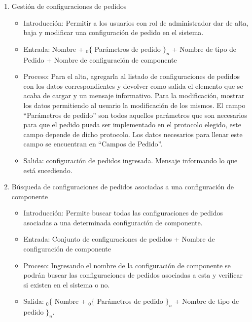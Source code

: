 \begin{enumerate}
			\item Gestión de configuraciones de pedidos
				\begin{itemize}
					\item Introducción: Permitir a los usuarios con rol de administrador dar de alta, baja y modificar una configuración de pedido en el sistema.
					\item Entrada: Nombre + ${}_{0}\{$ Parámetros de pedido $\}_n$ + Nombre de tipo de Pedido + Nombre de configuración de componente
					\item Proceso: Para el alta, agregarla al listado de configuraciones de pedidos con los datos correspondientes y devolver como salida el elemento que se acaba de cargar y un mensaje informativo.
					Para la modificación, mostrar los datos permitiendo al usuario la modificación de los mismos.
					El campo ``Parámetros de pedido'' son todos aquellos parámetros que son necesarios para que el pedido pueda ser implementado en el protocolo elegido, este campo depende de dicho protocolo. Los datos necesarios para llenar este campo se encuentran en ``Campos de Pedido''.
					\item Salida: configuración de pedidos ingresada. Mensaje informando lo que está sucediendo.
				\end{itemize}
				
			\item Búsqueda de configuraciones de pedidos asociadas a una configuración de componente
				\begin{itemize}
					\item Introducción: Permite buscar todas las configuraciones de pedidos asociadas a una determinada configuración de componente.
					\item Entrada: Conjunto de configuraciones de pedidos + Nombre de configuración de componente
					\item Proceso: Ingresando el nombre de la configuración de componente se podrán buscar las configuraciones de pedidos asociadas a esta y verificar si existen en el sistema o no.
					\item Salida: ${}_{0}\{$  Nombre + ${}_{0}\{$ Parámetros de pedido $\}_n$ + Nombre de tipo de pedido $\}_n$.
				\end{itemize}


\end{enumerate}
